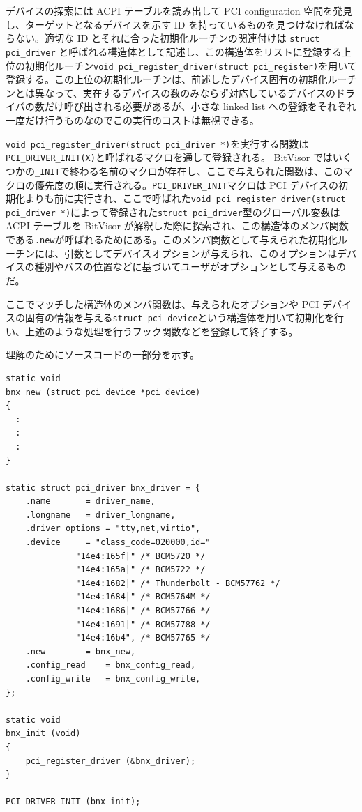 \documentclass[a4paper,11pt,report]{ltjsbook}
\begin{document}
デバイスの探索には ACPI テーブルを読み出して PCI configuration 空間を発見し、ターゲットとなるデバイスを示す ID を持っているものを見つけなければならない。適切な ID とそれに合った初期化ルーチンの関連付けは \lstinline!struct pci_driver! と呼ばれる構造体として記述し、この構造体をリストに登録する上位の初期化ルーチン\lstinline!void pci_register_driver(struct pci_register)!を用いて登録する。この上位の初期化ルーチンは、前述したデバイス固有の初期化ルーチンとは異なって、実在するデバイスの数のみならず対応しているデバイスのドライバの数だけ呼び出される必要があるが、小さな linked list への登録をそれぞれ一度だけ行うものなのでこの実行のコストは無視できる。

\lstinline!void pci_register_driver(struct pci_driver *)!を実行する関数は \lstinline!PCI_DRIVER_INIT(X)!と呼ばれるマクロを通して登録される。 BitVisor ではいくつかの\lstinline!_INIT!で終わる名前のマクロが存在し、ここで与えられた関数は、このマクロの優先度の順に実行される。\lstinline!PCI_DRIVER_INIT!マクロは PCI デバイスの初期化よりも前に実行され、ここで呼ばれた\lstinline!void pci_register_driver(struct pci_driver *)!によって登録された\lstinline!struct pci_driver!型のグローバル変数は ACPI テーブルを BitVisor が解釈した際に探索され、この構造体のメンバ関数である\lstinline!.new!が呼ばれるためにある。このメンバ関数として与えられた初期化ルーチンには、引数としてデバイスオプションが与えられ、このオプションはデバイスの種別やバスの位置などに基づいてユーザがオプションとして与えるものだ。

ここでマッチした構造体のメンバ関数は、与えられたオプションや PCI デバイスの固有の情報を与える\lstinline!struct pci_device!という構造体を用いて初期化を行い、上述のような処理を行うフック関数などを登録して終了する。

理解のためにソースコードの一部分を示す。

\begin{lstlisting}
static void
bnx_new (struct pci_device *pci_device)
{
  :
  :
  :
}

static struct pci_driver bnx_driver = {
	.name		= driver_name,
	.longname	= driver_longname,
	.driver_options	= "tty,net,virtio",
	.device		= "class_code=020000,id="
			  "14e4:165f|" /* BCM5720 */
			  "14e4:165a|" /* BCM5722 */
			  "14e4:1682|" /* Thunderbolt - BCM57762 */
			  "14e4:1684|" /* BCM5764M */
			  "14e4:1686|" /* BCM57766 */
			  "14e4:1691|" /* BCM57788 */
			  "14e4:16b4", /* BCM57765 */
	.new		= bnx_new,
	.config_read	= bnx_config_read,
	.config_write	= bnx_config_write,
};

static void
bnx_init (void)
{
	pci_register_driver (&bnx_driver);
}

PCI_DRIVER_INIT (bnx_init);
\end{lstlisting}
\end{document}
